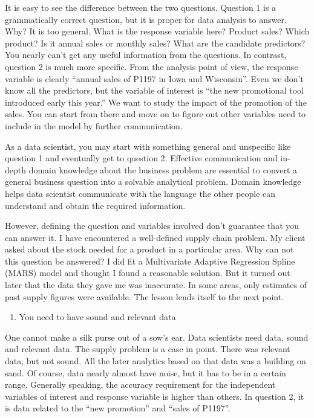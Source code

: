 \documentclass[12pt,]{krantz}
\providecommand{\tightlist}{%
  \setlength{\itemsep}{0pt}\setlength{\parskip}{0pt}}
\theoremstyle{definition}
\theoremstyle{definition}
\theoremstyle{remark}
\begin{document}
It is easy to see the difference between the two questions. Question 1
is a grammatically correct question, but it is proper for data analysis
to answer. Why? It is too general. What is the response variable here?
Product sales? Which product? Is it annual sales or monthly sales? What
are the candidate predictors? You nearly can't get any useful
information from the questions. In contrast, question 2 is much more
specific. From the analysis point of view, the response variable is
clearly ``annual sales of P1197 in Iowa and Wisconsin''. Even we don't
know all the predictors, but the variable of interest is ``the new
promotional tool introduced early this year.'' We want to study the
impact of the promotion of the sales. You can start from there and move
on to figure out other variables need to include in the model by further
communication.

As a data scientist, you may start with something general and unspecific
like question 1 and eventually get to question 2. Effective
communication and in-depth domain knowledge about the business problem
are essential to convert a general business question into a solvable
analytical problem. Domain knowledge helps data scientist communicate
with the language the other people can understand and obtain the
required information.

However, defining the question and variables involved don't guarantee
that you can answer it. I have encountered a well-defined supply chain
problem. My client asked about the stock needed for a product in a
particular area. Why can not this question be answered? I did fit a
Multivariate Adaptive Regression Spline (MARS) model and thought I found
a reasonable solution. But it turned out later that the data they gave
me was inaccurate. In some areas, only estimates of past supply figures
were available. The lesson lends itself to the next point.

\begin{enumerate}
\def\labelenumi{\arabic{enumi}.}
\setcounter{enumi}{1}
\tightlist
\item
  You need to have sound and relevant data
\end{enumerate}

One cannot make a silk purse out of a sow's ear. Data scientists need
data, sound and relevant data. The supply problem is a case in point.
There was relevant data, but not sound. All the later analytics based on
that data was a building on sand. Of course, data nearly almost have
noise, but it has to be in a certain range. Generally speaking, the
accuracy requirement for the independent variables of interest and
response variable is higher than others. In question 2, it is data
related to the ``new promotion'' and ``sales of P1197''.
\end{document}
